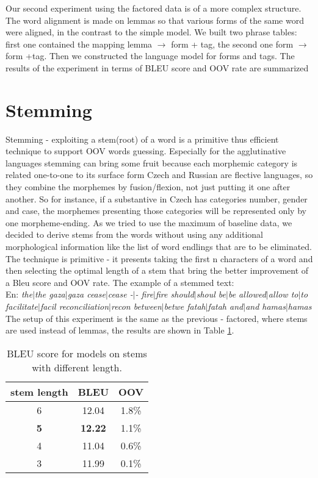 \documentclass[11pt,letterpaper]{article}
\begin{document}
Our second experiment using the factored data is of a more complex structure.
The word alignment is made on lemmas so that various forms of the same word
were aligned, in the contrast to the simple model. We built two phrase tables:
first one contained the mapping lemma $\rightarrow$ form + tag, the second one 
form $\rightarrow$ form +tag. Then we constructed the language model for forms
and tags. The results of the experiment in terms of BLEU score and OOV rate are 
summarized 


\section{Stemming}
Stemming - exploiting a stem(root) of a word is a primitive thus efficient technique to support OOV words guessing.
Especially for the agglutinative languages stemming can bring some fruit because
each morphemic category is related one-to-one to its surface form%
Czech and Russian are flective languages, so they combine the morphemes by fusion/flexion,
not just putting it one after another. So for instance, if a substantive in Czech has categories
 number, gender and case, the morphemes presenting those categories will be represented only
by one morpheme-ending. 
As we tried to use the maximum of baseline data, we decided to derive stems from the words
without using any additional morphological information like the list of word endlings that are to be eliminated.
The technique is primitive - it presents taking the first n characters of a word and then selecting the optimal
length of a stem that bring the better improvement of a Bleu score and OOV rate.
The example of a stemmed text:\\
En: \textit{the$|$the gaza$|$gaza cease$|$cease -$|$- fire$|$fire should$|$shoul be$|$be allowed$|$allow to$|$to facilitate$|$facil 
reconciliation$|$recon between$|$betwe fatah$|$fatah and$|$and hamas$|$hamas}
The setup of this experiment is the same as the previous - factored, where stems are used instead of lemmas,
the results are shown in Table \ref{tab:stem}.

\begin{table}
\begin{center}
\begin{tabular} {c c c}
\hline
stem length&BLEU&OOV\\
\hline
6 & 12.04&1.8\%\\
\bf{5} & \bf{12.22} &1.1\%\\
4 & 11.04& 0.6\%\\
3 & 11.99& 0.1\%\\
\hline
\end{tabular}
\caption{BLEU score for models on stems with different length.}
\label{tab:stem}
\end{center}
\end{table}
\end{document}

